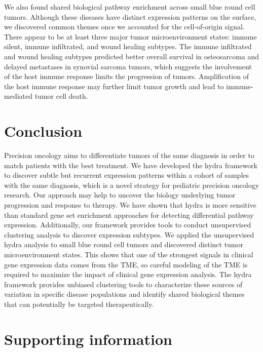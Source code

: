 \documentclass[10pt,letterpaper]{article}
\begin{document}
We also found shared biological pathway enrichment across small blue round cell tumors. Although these diseases have distinct expression patterns on the surface, we discovered common themes once we accounted for the cell-of-origin signal. There appear to be at least three major tumor microenvironment states: immune silent, immune infiltrated, and wound healing subtypes. The immune infiltrated and wound healing subtypes predicted better overall survival in osteosarcoma and delayed metastases in synovial sarcoma tumors, which suggests the involvement of the host immune response limits the progression of tumors. Amplification of the host immune response may further limit tumor growth and lead to immune-mediated tumor cell death. 

\section*{Conclusion}
Precision oncology aims to differentiate tumors of the same diagnosis in order to match patients with the best treatment. We have developed the hydra framework to discover subtle but recurrent expression patterns within a cohort of samples with the same diagnosis, which is a novel strategy for pediatric precision oncology research. Our approach may help to uncover the biology underlying tumor progression and response to therapy. We have shown that hydra is more sensitive than standard gene set enrichment approaches for detecting differential pathway expression. Additionally, our framework provides tools to conduct unsupervised clustering analysis to discover expression subtypes. We applied the unsupervised hydra analysis to small blue round cell tumors and discovered distinct tumor microenvironment states. This shows that one of the strongest signals in clinical gene expression data comes from the TME, so careful modeling of the TME is required to maximize the impact of clinical gene expression analysis. The hydra framework provides unbiased clustering tools to characterize these sources of variation in specific disease populations and identify shared biological themes that can potentially be targeted therapeutically.

\section*{Supporting information}

\end{document}
